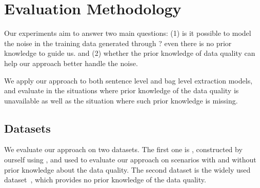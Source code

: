 \section{Evaluation Methodology}

Our experiments aim to answer two main questions: 
(1) is it possible to model the noise in the training data generated through  \DS? even there is no prior knowledge to guide us.
% 
and (2) whether the prior knowledge of data quality can help our approach better handle the noise.

We apply our approach to both sentence level and bag level
extraction models, and evaluate in the situations where prior knowledge of
the data quality is unavailable as well as the situation where such prior
knowledge is missing.


\subsection{Datasets}
We evaluate our approach on two datasets. The first one is  \TimeRE, constructed by ourself using \DS, 
and used to evaluate our approach on scenarios with and without prior knowledge about the 
data quality. The second dataset is the widely used \EntityRE dataset~\cite{riedel2010modeling},
which provides no prior knowledge of the data quality.


